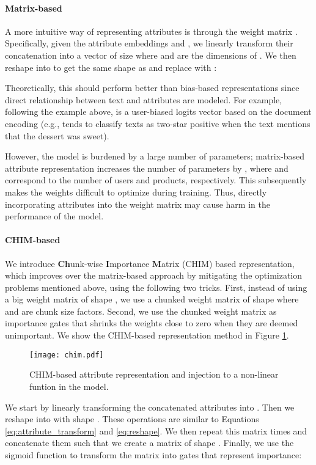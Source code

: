 \documentclass[11pt,a4paper]{article}
\begin{document}
\paragraph{Matrix-based}

A more intuitive way of representing attributes is through the weight matrix . Specifically, given the attribute embeddings  and , we linearly transform their concatenation into a vector  of size  where  and  are the dimensions of . We then reshape  into  to get the same shape as  and replace  with :

Theoretically, this should perform better than bias-based representations since direct relationship between text and attributes are modeled. For example, following the example above,  is a user-biased logits vector based on the document encoding  (e.g.,  tends to classify texts as two-star positive when the text mentions that the dessert was sweet).

However, the model is burdened by a large number of parameters; matrix-based attribute representation increases the number of parameters by , where  and  correspond to the number of users and products, respectively. This
subsequently makes the weights difficult to optimize during training. Thus, directly incorporating attributes into the weight matrix may cause harm in the performance of the model.

\paragraph{CHIM-based}

We introduce \textbf{Ch}unk-wise \textbf{I}mportance \textbf{M}atrix (CHIM) based representation, which improves over the matrix-based approach by mitigating the optimization problems mentioned above, using the following two tricks. First, instead of using a big weight matrix  of shape , we use a chunked weight matrix  of shape  where  and  are chunk size factors. Second, we use the chunked weight matrix as importance gates that shrinks the weights close to zero when they are deemed unimportant. We show the CHIM-based representation method in Figure \ref{fig:model}.

\begin{figure}[t]
    \centering
    \texttt{[image: chim.pdf]}
    \caption{CHIM-based attribute representation and injection to a non-linear funtion in the model.}
    \label{fig:model}
\end{figure}

We start by linearly transforming the concatenated attributes into . Then we reshape  into  with shape . These operations are similar to Equations \ref{eq:attribute_transform} and \ref{eq:reshape}. We then repeat this matrix  times and concatenate them such that we create a matrix  of shape . Finally, we use the sigmoid function  to transform the matrix into gates that represent importance:
\end{document}
